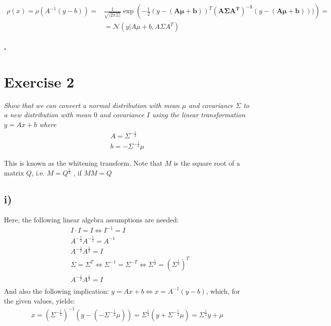 \documentclass[11pt]{scrartcl} %
\begin{document}
         \begin{equation}
           \begin{split}
             \rho(x)=\rho(A^{-1}(y-b)) = &\frac{1}{\sqrt{|2\pi\Sigma|}} \exp\left(-\frac{1}{2}(y-\mathbf{(A\mu+b)})^T\mathbf{(A\Sigma A^T)^{-1}} (y-\mathbf{(A\mu+b)}))\right) = \\
             &= \mathcal{N}(y | A\mu+b, A\Sigma A^T)\\
           \end{split}
         \end{equation}
         
         \begin{flushright}
           $\square$\\
         \end{flushright}

         

\vspace{5mm}
\section*{Exercise 2}
         {\it Show that we can convert a normal distribution with mean \(\mu\) and covariance \(\Sigma\) to a new distribution with mean \(0\) and covariance \(I\) using the linear transformation \(y = Ax+b\) where
           \begin{align*}
             A= \Sigma^{-\frac{1}{2}}\\
             b=-\Sigma^{-\frac{1}{2}}\mu
           \end{align*}

         This is known as the whitening transform. Note that \(M\) is the square root of a matrix \(Q\), i.e. \(M = Q^{\frac{1}{2}}\) , if \(M M = Q\)}

         
         \subsection*{i)}
         Here, the following linear algebra assumptions are needed:
         \begin{equation}
           \begin{split}
             &I\cdot I = I \iff I^{-1} = I\\
             &A^{-\frac{1}{2}}A^{-\frac{1}{2}} = A^{-1}\\
             &A^{-\frac{1}{2}}A^{\frac{1}{2}} = I\\
             &\Sigma= \Sigma^T \iff \Sigma^{-1}= \Sigma^{-T} \iff \Sigma^{\frac{1}{2}}= (\Sigma^{\frac{1}{2}})^T\\
             &A^{-\frac{1}{2}}A^{\frac{1}{2}} = I\\
           \end{split}
         \end{equation}
         And also the following implication: \(y=Ax+b \iff x = A^{-1}(y-b)\), which, for the given values, yields:
         \begin{align*}
           x = (\Sigma^{-\frac{1}{2}})^{-1}(y-(-\Sigma^{-\frac{1}{2}}\mu)) = \Sigma^{\frac{1}{2}}(y+\Sigma^{-\frac{1}{2}}\mu) = \Sigma^{\frac{1}{2}}y +\mu
         \end{align*}
\end{document}
